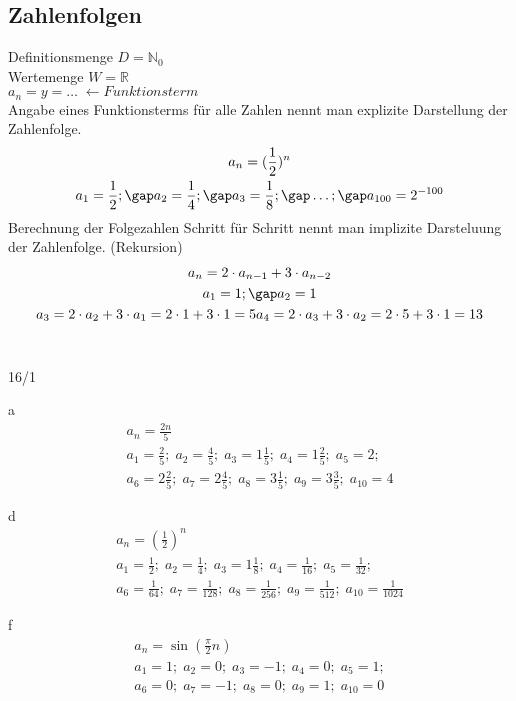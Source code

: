 \subsection{Zahlenfolgen}
Definitionsmenge $D = \mathbb{N}_0$ \\
Wertemenge $W = \mathbb{R}$ \\
$a_n = y = \dots \;\leftarrow Funktionsterm$ \\
Angabe eines Funktionsterms für alle Zahlen nennt man explizite Darstellung der Zahlenfolge. \\
\begin{gather*}
  a_n = (\frac{1}{2})^n \\
  a_1 = \frac{1}{2};\gap a_2 = \frac{1}{4};\gap a_3 = \frac{1}{8}; \gap\dots;\gap a_{100} = 2^{-100}
\end{gather*}
Berechnung der Folgezahlen Schritt für Schritt nennt man implizite Darsteluung der Zahlenfolge. (Rekursion) \\
\begin{gather*}
  a_n = 2 \cdot a_{n-1} + 3 \cdot a_{n-2} \\
  a_1 = 1;\gap a_2 = 1 \\
  a_3 = 2 \cdot a_2 + 3 \cdot a_1 = 2 \cdot 1 + 3 \cdot 1 = 5
  a_4 = 2 \cdot a_3 + 3 \cdot a_2 = 2 \cdot 5 + 3 \cdot 1 = 13
\end{gather*} \\
\begin{exercise}{16/1}
  \item [a]
  \begin{gather*}
    a_n = \frac{2n}{5} \\
    a_1 = \frac{2}{5};\; a_2 = \frac{4}{5};\; a_3 = 1\frac{1}{5};\; a_4 = 1\frac{2}{5};\; a_5 = 2;\\
    a_6 = 2\frac{2}{5};\; a_7 = 2\frac{4}{5};\; a_8 = 3\frac{1}{5};\; a_9 = 3\frac{3}{5};\; a_{10} = 4
  \end{gather*}
  \item [d]
  \begin{gather*}
    a_n = (\frac{1}{2})^n \\
    a_1 = \frac{1}{2};\; a_2 = \frac{1}{4};\; a_3 = 1\frac{1}{8};\; a_4 = \frac{1}{16};\; a_5 = \frac{1}{32};\\
    a_6 = \frac{1}{64};\; a_7 = \frac{1}{128};\; a_8 = \frac{1}{256};\; a_9 = \frac{1}{512};\; a_{10} = \frac{1}{1024}
  \end{gather*}
  \item [f]
  \begin{gather*}
    a_n = \sin(\frac{\pi}{2}n) \\
    a_1 = 1;\; a_2 = 0;\; a_3 = -1;\; a_4 = 0;\; a_5 = 1;\\
    a_6 = 0;\; a_7 = -1;\; a_8 = 0;\; a_9 = 1;\; a_{10} = 0
  \end{gather*}
\end{exercise}
